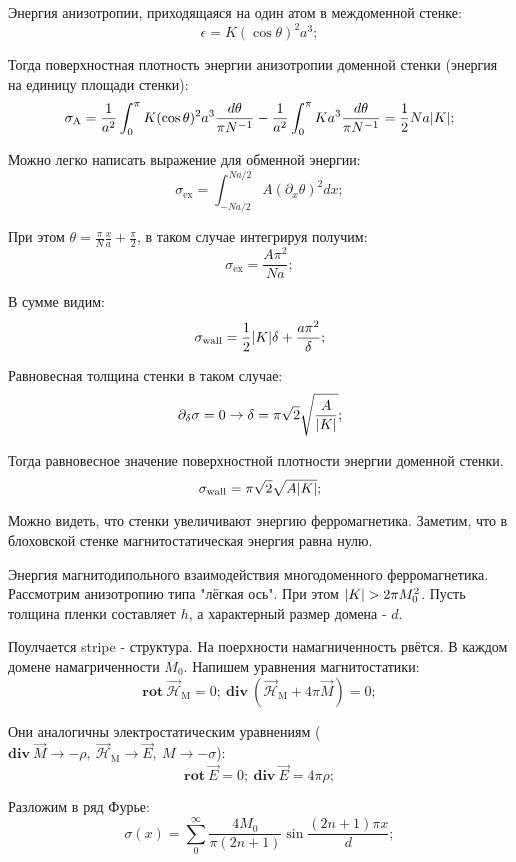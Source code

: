 \documentclass[a4paper, 14pt, russian]{article}
\newcommand{\be}{\begin{equation}}
\newcommand{\ee}{\end{equation}}
\newcommand{\pa}{\partial}
\newcommand{\rot}{\textbf{rot}~}
\renewcommand{\div}{\textbf{div}~}
\begin{document}
	Энергия анизотропии, приходящаяся на один атом в междоменной стенке:
	\be
		\epsilon = K (\cos \theta)^2 a^3;
	\ee

	Тогда поверхностная плотность энергии анизотропии доменной стенки (энергия
	на единицу площади стенки):
	\be
		\label{eq143}
		\sigma_\text{A} = \frac{1}{a^2} \int_0^\pi K (\cos \theta)^2 a^3 
			\frac{d\theta}{\pi N^{-1}} - \frac{1}{a^2} \int_0^\pi
			K a^3 \frac{d\theta}{\pi N^{-1}} = \frac{1}{2}N a \abs{K};
	\ee

	Можно легко написать выражение для обменной энергии:
	\be
		\sigma_\text{ex} = \int_{-Na /2 }^{Na / 2} A (\pa_x \theta)^2 dx;
	\ee

	При этом  $\theta = \frac{\pi}{N} \frac{x}{a} + \frac{\pi }{ 2}$, в таком
	случае интегрируя получим:
	\be
		\label{eq148}
		\sigma_\text{ex} = \frac{A\pi^2}{Na};
	\ee

	В сумме видим:
	\be
		\label{eq149}
		\sigma_\text{wall} = \frac{1}{2} \abs{K} \delta + \frac{a\pi^2}{\delta};
	\ee

	Равновесная толщина стенки в таком случае:
	\be
		\label{eq150}
		\pa_\delta \sigma = 0 \rightarrow \delta = \pi \sqrt 2 \sqrt{\frac{A}{\abs{ K}}};
	\ee

	Тогда равновесное значение поверхностной плотности энергии доменной стенки.
	\be
		\label{eq151}
		\sigma_\text{wall} = \pi \sqrt 2 \sqrt{A \abs{K}};
	\ee

	Можно видеть, что стенки увеличивают энергию ферромагнетика. Заметим, что
	в блоховской стенке магнитостатическая энергия равна нулю.

	Энергия магнитодипольного взаимодействия многодоменного ферромагнетика.
	Рассмотрим анизотропию типа "лёгкая ось". При этом 
	$\abs{K} > 2 \pi M_0^2$. Пусть толщина пленки составляет
	$h$, а характерный размер домена - $d$. 
	
	Поулчается stripe - структура. На поерхности намагниченность рвётся. В каждом 
	домене намагриченности $M_0$. Напишем уравнения магнитостатики:
	\be
		\rot \vec{\mathcal H}_\text{M} = 0;~ 
		\div(\vec{\mathcal H}_\text{M} + 4 \pi \vec M) = 0;
	\ee

	Они аналогичны электростатическим уравнениям ($\div \vec M \rightarrow - \rho,~
	\vec{\mathcal H}_\text{M} \rightarrow \vec E,~M \rightarrow - \sigma$):
	\be
		\rot \vec E = 0;~
		\div \vec E = 4 \pi \rho;
	\ee

	Разложим в ряд Фурье:
	\be
		\label{eq152}
		\sigma(x) = \sum_0^\infty \frac{4M_0}{\pi (2 n + 1)} \sin \frac{(2n + 1)\pi x}{d};
	\ee
\end{document}
